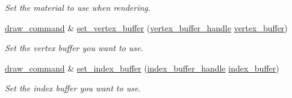\begin{DoxyCompactItemize}
\begin{DoxyCompactList}\small\item\em Set the material to use when rendering. \end{DoxyCompactList}\item 
\mbox{\hyperlink{classmoka_1_1draw__command}{draw\+\_\+command}} \& \mbox{\hyperlink{classmoka_1_1draw__command_af6b7448828b6ab837d25716e8a80acdc}{set\+\_\+vertex\+\_\+buffer}} (\mbox{\hyperlink{structmoka_1_1vertex__buffer__handle}{vertex\+\_\+buffer\+\_\+handle}} \mbox{\hyperlink{classmoka_1_1draw__command_aa16638c2fa411a81474d75e1e385be54}{vertex\+\_\+buffer}})
\begin{DoxyCompactList}\small\item\em Set the vertex buffer you want to use. \end{DoxyCompactList}\item 
\mbox{\hyperlink{classmoka_1_1draw__command}{draw\+\_\+command}} \& \mbox{\hyperlink{classmoka_1_1draw__command_aee4541756627cf7a1cc7d495c815b3c9}{set\+\_\+index\+\_\+buffer}} (\mbox{\hyperlink{structmoka_1_1index__buffer__handle}{index\+\_\+buffer\+\_\+handle}} \mbox{\hyperlink{classmoka_1_1draw__command_ab05fb02edc9e31e20ecb875ad2a496e4}{index\+\_\+buffer}})
\begin{DoxyCompactList}\small\item\em Set the index buffer you want to use. \end{DoxyCompactList}\end{DoxyCompactItemize}
